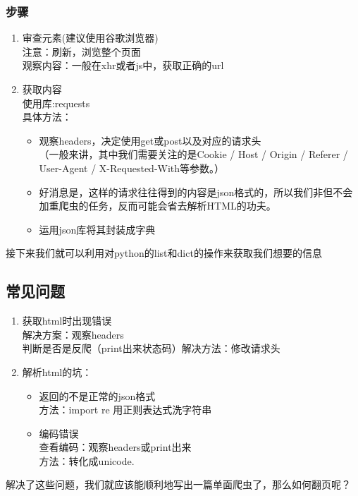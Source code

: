 \documentclass{beamer}
\begin{document}
\begin{frame}
\frametitle{步骤}
\begin{enumerate}
  \item 审查元素(建议使用谷歌浏览器)\\注意：刷新，浏览整个页面\\观察内容：一般在xhr或者js中，获取正确的url
  \item 获取内容 \\ 使用库:requests \\ 具体方法：
  \begin{itemize}
  	\item 观察headers，决定使用get或post以及对应的请求头\\（一般来讲，其中我们需要关注的是Cookie / Host / Origin
  	/ Referer / User-Agent / X-Requested-With等参数。）
  	\item 好消息是，这样的请求往往得到的内容是json格式的，所以我们非但不会加重爬虫的任务，反而可能会省去解析HTML的功夫。
  	\item 运用json库将其封装成字典
  \end{itemize}
  
\end{enumerate}
接下来我们就可以利用对python的list和dict的操作来获取我们想要的信息
\end{frame}

\subsection{常见问题}
\begin{frame}
\begin{enumerate}
  \item 获取html时出现错误\\解决方案：观察headers\\判断是否是反爬（print出来状态码）解决方法：修改请求头
  \item 解析html的坑：
  \begin{itemize}
  	\item 返回的不是正常的json格式\\方法：import re 用正则表达式洗字符串
  	\item 编码错误\\查看编码：观察headers或print出来\\方法：转化成unicode.
  	\end{itemize}
  	
\end{enumerate}
解决了这些问题，我们就应该能顺利地写出一篇单面爬虫了，那么如何翻页呢？
\end{frame}
\end{document}
